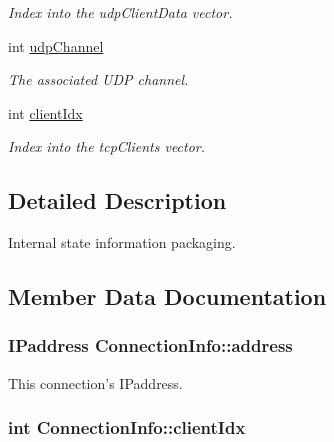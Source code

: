 \begin{DoxyCompactItemize}
\begin{DoxyCompactList}\small\item\em Index into the udp\-Client\-Data vector. \end{DoxyCompactList}\item 
int \hyperlink{structConnectionInfo_ac364b6c833eadbb548fdde4aa1cb691e}{udp\-Channel}
\begin{DoxyCompactList}\small\item\em The associated U\-D\-P channel. \end{DoxyCompactList}\item 
int \hyperlink{structConnectionInfo_aaa20ce6a0f056ef96bbca7282f34dd4c}{client\-Idx}
\begin{DoxyCompactList}\small\item\em Index into the tcp\-Clients vector. \end{DoxyCompactList}\end{DoxyCompactItemize}


\subsection{Detailed Description}
Internal state information packaging. 

\subsection{Member Data Documentation}
\hypertarget{structConnectionInfo_af014df0a6739ea51a6a532ec352f7848}{
\subsubsection[{address}]{\setlength{\rightskip}{0pt plus 5cm}I\-Paddress Connection\-Info\-::address}}\label{structConnectionInfo_af014df0a6739ea51a6a532ec352f7848}


This connection's I\-Paddress. 

\hypertarget{structConnectionInfo_aaa20ce6a0f056ef96bbca7282f34dd4c}{
\subsubsection[{client\-Idx}]{\setlength{\rightskip}{0pt plus 5cm}int Connection\-Info\-::client\-Idx}}\label{structConnectionInfo_aaa20ce6a0f056ef96bbca7282f34dd4c}



